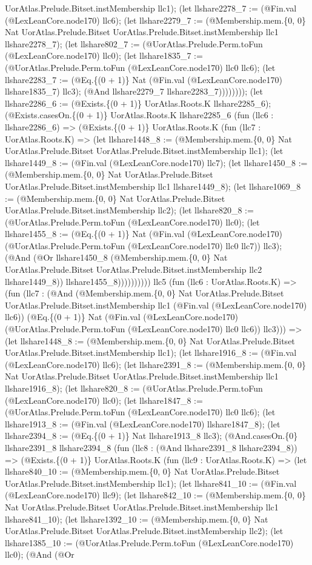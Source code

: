 \documentclass[11pt]{article}
\begin{document}
UorAtlas.Prelude.Bitset.instMembership llc1); (let llshare2278\_7 := (@Fin.val (@LexLeanCore.node170) llc6); (let llshare2279\_7 := (@Membership.mem.\{0, 0\} Nat UorAtlas.Prelude.Bitset UorAtlas.Prelude.Bitset.instMembership llc1 llshare2278\_7); (let llshare802\_7 := (@UorAtlas.Prelude.Perm.toFun (@LexLeanCore.node170) llc0); (let llshare1835\_7 := (@UorAtlas.Prelude.Perm.toFun (@LexLeanCore.node170) llc0 llc6); (let llshare2283\_7 := (@Eq.\{(0 + 1)\} Nat (@Fin.val (@LexLeanCore.node170) llshare1835\_7) llc3); (@And llshare2279\_7 llshare2283\_7)))))))); (let llshare2286\_6 := (@Exists.\{(0 + 1)\} UorAtlas.Roots.K llshare2285\_6); (@Exists.casesOn.\{(0 + 1)\} UorAtlas.Roots.K llshare2285\_6 (fun (llc6 : llshare2286\_6) => (@Exists.\{(0 + 1)\} UorAtlas.Roots.K (fun (llc7 : UorAtlas.Roots.K) => (let llshare1448\_8 := (@Membership.mem.\{0, 0\} Nat UorAtlas.Prelude.Bitset UorAtlas.Prelude.Bitset.instMembership llc1); (let llshare1449\_8 := (@Fin.val (@LexLeanCore.node170) llc7); (let llshare1450\_8 := (@Membership.mem.\{0, 0\} Nat UorAtlas.Prelude.Bitset UorAtlas.Prelude.Bitset.instMembership llc1 llshare1449\_8); (let llshare1069\_8 := (@Membership.mem.\{0, 0\} Nat UorAtlas.Prelude.Bitset UorAtlas.Prelude.Bitset.instMembership llc2); (let llshare820\_8 := (@UorAtlas.Prelude.Perm.toFun (@LexLeanCore.node170) llc0); (let llshare1455\_8 := (@Eq.\{(0 + 1)\} Nat (@Fin.val (@LexLeanCore.node170) (@UorAtlas.Prelude.Perm.toFun (@LexLeanCore.node170) llc0 llc7)) llc3); (@And (@Or llshare1450\_8 (@Membership.mem.\{0, 0\} Nat UorAtlas.Prelude.Bitset UorAtlas.Prelude.Bitset.instMembership llc2 llshare1449\_8)) llshare1455\_8)))))))))) llc5 (fun (llc6 : UorAtlas.Roots.K) => (fun (llc7 : (@And (@Membership.mem.\{0, 0\} Nat UorAtlas.Prelude.Bitset UorAtlas.Prelude.Bitset.instMembership llc1 (@Fin.val (@LexLeanCore.node170) llc6)) (@Eq.\{(0 + 1)\} Nat (@Fin.val (@LexLeanCore.node170) (@UorAtlas.Prelude.Perm.toFun (@LexLeanCore.node170) llc0 llc6)) llc3))) => (let llshare1448\_8 := (@Membership.mem.\{0, 0\} Nat UorAtlas.Prelude.Bitset UorAtlas.Prelude.Bitset.instMembership llc1); (let llshare1916\_8 := (@Fin.val (@LexLeanCore.node170) llc6); (let llshare2391\_8 := (@Membership.mem.\{0, 0\} Nat UorAtlas.Prelude.Bitset UorAtlas.Prelude.Bitset.instMembership llc1 llshare1916\_8); (let llshare820\_8 := (@UorAtlas.Prelude.Perm.toFun (@LexLeanCore.node170) llc0); (let llshare1847\_8 := (@UorAtlas.Prelude.Perm.toFun (@LexLeanCore.node170) llc0 llc6); (let llshare1913\_8 := (@Fin.val (@LexLeanCore.node170) llshare1847\_8); (let llshare2394\_8 := (@Eq.\{(0 + 1)\} Nat llshare1913\_8 llc3); (@And.casesOn.\{0\} llshare2391\_8 llshare2394\_8 (fun (llc8 : (@And llshare2391\_8 llshare2394\_8)) => (@Exists.\{(0 + 1)\} UorAtlas.Roots.K (fun (llc9 : UorAtlas.Roots.K) => (let llshare840\_10 := (@Membership.mem.\{0, 0\} Nat UorAtlas.Prelude.Bitset UorAtlas.Prelude.Bitset.instMembership llc1); (let llshare841\_10 := (@Fin.val (@LexLeanCore.node170) llc9); (let llshare842\_10 := (@Membership.mem.\{0, 0\} Nat UorAtlas.Prelude.Bitset UorAtlas.Prelude.Bitset.instMembership llc1 llshare841\_10); (let llshare1392\_10 := (@Membership.mem.\{0, 0\} Nat UorAtlas.Prelude.Bitset UorAtlas.Prelude.Bitset.instMembership llc2); (let llshare1385\_10 := (@UorAtlas.Prelude.Perm.toFun (@LexLeanCore.node170) llc0); (@And (@Or 
\end{document}

